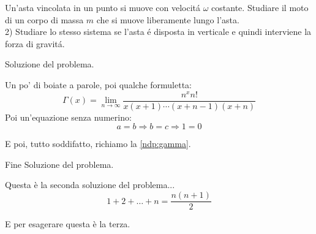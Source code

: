 \documentclass[../main.tex]{subfiles}
\begin{document}

\textex
Un'asta vincolata in un punto si muove con velocit\'{a} $\omega$ costante. Studiare il moto di un corpo di massa $m$ che si muove liberamente lungo l'asta. \\
2) Studiare lo stesso sistema se l'asta \'{e} disposta in verticale e quindi interviene la forza di gravit\'{a}.

\solution
Soluzione del problema.

Un po' di boiate a parole, poi qualche formuletta:
\begin{equation}\label{ndp:gamma}
	\Gamma(x)=\lim_{n\to\infty} \dfrac{n^xn!}{x(x+1)\cdots (x+n-1)(x+n)}
\end{equation}
Poi un'equazione senza numerino:
\begin{equation*}
	a=b \Rightarrow b=c \Rightarrow 1=0
\end{equation*}

E poi, tutto soddifatto, richiamo la \cref{ndp:gamma}.

Fine Soluzione del problema.

\solution[2]
Questa è la seconda soluzione del problema...
\begin{equation}
	1+2+\dots+n=\frac{n(n+1)}2
\end{equation}

\solution[3]
E per esagerare questa è la terza.
\end{document}
